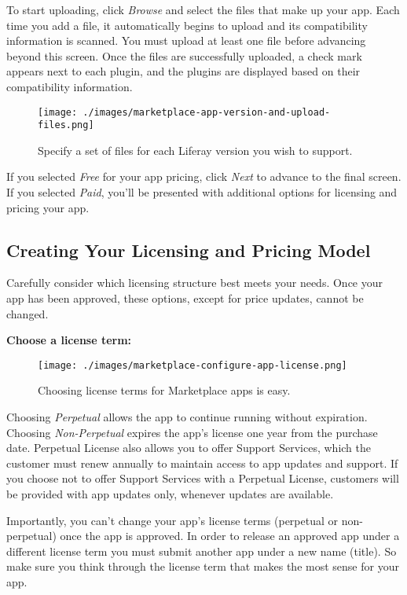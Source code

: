 To start uploading, click \emph{Browse} and select the files that make
up your app. Each time you add a file, it automatically begins to upload
and its compatibility information is scanned. You must upload at least
one file before advancing beyond this screen. Once the files are
successfully uploaded, a check mark appears next to each plugin, and the
plugins are displayed based on their compatibility information.

\begin{figure}
\centering
\texttt{[image: ./images/marketplace-app-version-and-upload-files.png]}
\caption{Specify a set of files for each Liferay version you wish to
support.}
\end{figure}

If you selected \emph{Free} for your app pricing, click \emph{Next} to
advance to the final screen. If you selected \emph{Paid}, you'll be
presented with additional options for licensing and pricing your app.

\subsection{Creating Your Licensing and Pricing
Model}\label{creating-your-licensing-and-pricing-model}

Carefully consider which licensing structure best meets your needs. Once
your app has been approved, these options, except for price updates,
cannot be changed.

\textbf{Choose a license term:}

\begin{figure}
\centering
\texttt{[image: ./images/marketplace-configure-app-license.png]}
\caption{Choosing license terms for Marketplace apps is easy.}
\end{figure}

Choosing \emph{Perpetual} allows the app to continue running without
expiration. Choosing \emph{Non-Perpetual} expires the app's license one
year from the purchase date. Perpetual License also allows you to offer
Support Services, which the customer must renew annually to maintain
access to app updates and support. If you choose not to offer Support
Services with a Perpetual License, customers will be provided with app
updates only, whenever updates are available.

Importantly, you can't change your app's license terms (perpetual or
non-perpetual) once the app is approved. In order to release an approved
app under a different license term you must submit another app under a
new name (title). So make sure you think through the license term that
makes the most sense for your app.

